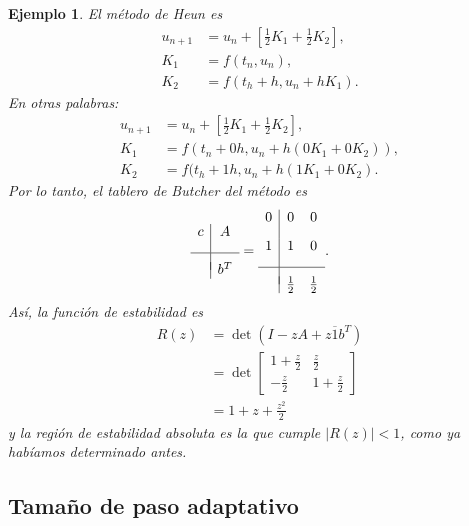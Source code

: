 \documentclass[11pt,letterpaper]{report}
\newtheorem{example}{Ejemplo}
\newcommand\ol\overline
\begin{document}
\begin{example}
  El método de Heun es
  \begin{align}
    u_{n+1} &= u_n
    + \left[ \frac{1}{2} K_1 + \frac{1}{2} K_2 \right], \\
    K_1 &= f(t_n,u_n), \\
    K_2 &= f(t_h+h,u_n+hK_1)
  .\end{align}
  En otras palabras:
  \begin{align}
    u_{n+1} &= u_n
    + \left[ \frac{1}{2} K_1 + \frac{1}{2} K_2 \right], \\
    K_1 &= f(t_n + 0 h,u_n + h(0 K_1 + 0 K_2)), \\
    K_2 &= f(t_h + 1 h,u_n+h(1 K_1 + 0 K_2)
  .\end{align}
  Por lo tanto, el tablero de Butcher del método es
  \begin{equation}
    \begin{array}{c|c}
      c & A \\[3mm]
      \hline \\[-2mm]
        & b^{T}
    \end{array}
    =
    \begin{array}{c|cc}
      0 & 0 & 0 \\[3mm]
      1 & 1 & 0 \\[3mm]
      \hline \\[-2mm]
        & \frac{1}{2} & \frac{1}{2}
    \end{array}
  .\end{equation}
  Así, la función de estabilidad es
  \begin{align}
    R(z)
    &= \det(I - zA + z\ol{1}b^{T}) \\
    &=
    \det
    \begin{bmatrix}
      1 + \frac{z}{2} & \frac{z}{2} \\
      -\frac{z}{2} & 1 + \frac{z}{2}
    \end{bmatrix}
    \\
    &= 1 + z + \frac{z^{2}}{2}
  \end{align}
  y la región de estabilidad absoluta es la que cumple $|R(z)|<1$,
  como ya habíamos determinado antes.
\end{example}

\subsection{Tamaño de paso adaptativo}
\end{document}
